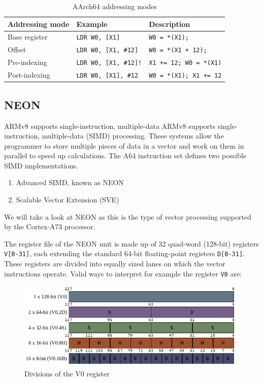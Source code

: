 \begin{table}[h!]
    \centering
    \small
    \begin{tabularx}{\textwidth}{llX}
        \toprule
        Addressing mode & Example & Description \\
        \midrule
        Base register & \texttt{LDR W0, [X1]} & \texttt{W0 = *(X1);} \\
        Offset & \texttt{LDR W0, [X1, \#12]} & \texttt{W0 = *(X1 + 12);} \\
        Pre-indexing & \texttt{LDR W0, [X1, \#12]!} & \texttt{X1 += 12; W0 = *(X1)} \\
        Post-indexing & \texttt{LDR W0, [X1], \#12} & \texttt{W0 = *(X1); X1 += 12} \\
        \bottomrule
    \end{tabularx}
    \caption{AArch64 addressing modes}
\end{table}

\subsection{NEON}
\label{ss:neon}

ARMv8 supports single-instruction, multiple-data ARMv8 supports
single-instruction, multiple-data (SIMD) processing. These systems allow the
programmer to store multiple pieces of data in a vector and work on them in
parallel to speed up calculations. The A64 instruction set defines two possible
SIMD implementations.

\begin{enumerate}
    \item Advanced SIMD, known as NEON
    \item Scalable Vector Extension (SVE)
\end{enumerate}

We will take a look at NEON as this is the type of vector processing supported
by the Cortex-A73 processor.

The register file of the NEON unit is made up of 32 quad-word (128-bit)
registers \texttt{V[0-31]}, each extending the standard 64-bit floating-point
registers \mbox{\texttt{D[0-31]}}. These registers are divided into equally
sized lanes on which the vector instructions operate. Valid ways to interpret
for example the register \texttt{V0} are:

\begin{figure}[h!]
    \centering
    \includegraphics[width=\textwidth]{Figures/V_register.pdf}
    \caption{Divisions of the V0 register}
\end{figure}

